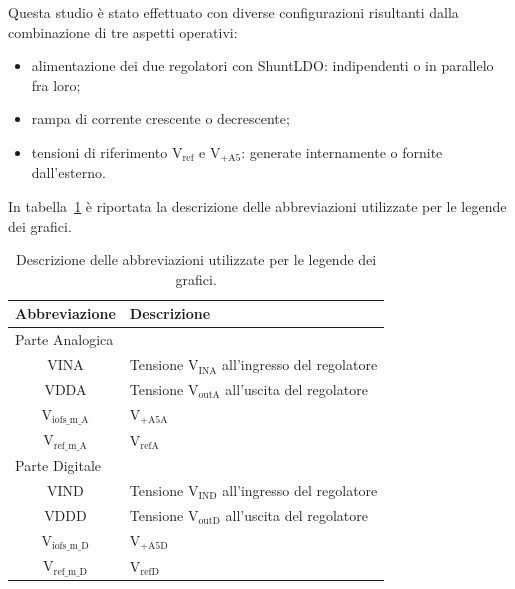 Questa studio è stato effettuato con diverse configurazioni risultanti dalla combinazione di tre aspetti operativi:
\begin{itemize}
  \item alimentazione dei due regolatori con ShuntLDO: indipendenti o in parallelo fra loro;
  \item rampa di corrente crescente o decrescente;
  \item tensioni di riferimento $\mathrm{V_{ref}}$ e $\mathrm{V_{+A5}}$: generate internamente o fornite dall'esterno.
\end{itemize}

In tabella~\ref{tab:legenda} è riportata la descrizione delle abbreviazioni utilizzate per le legende dei grafici.
\begin{table}
\begin{center}
\begin{tabular}{c|l}
 Abbreviazione & Descrizione\\ \hline
\multicolumn{2}{l}{Parte Analogica} \\
\hline
VINA & Tensione $\mathrm{V_{INA}}$ all'ingresso del regolatore  \\ \hline
VDDA & Tensione $\mathrm{V_{outA}}$ all'uscita del regolatore \\ \hline
$\mathrm{V_{iofs \_ m \_ A}}$ & $\mathrm{V_{+A5A}}$ \\ \hline   
$\mathrm{V_{ref \_ m \_ A}}$  & $\mathrm{V_{refA}}$ \\ \hline \hline  
\multicolumn{2}{l}{Parte Digitale} \\ \hline
VIND & Tensione $\mathrm{V_{IND}}$ all'ingresso del regolatore  \\ \hline
VDDD & Tensione $\mathrm{V_{outD}}$ all'uscita del regolatore \\ \hline
$\mathrm{V_{iofs \_ m \_ D}}$ & $\mathrm{V_{+A5D}}$ \\ \hline   
$\mathrm{V_{ref \_ m \_ D}}$  & $\mathrm{V_{refD}}$ \\ 
\end{tabular}
\end{center}
\caption{Descrizione delle abbreviazioni utilizzate per le legende dei grafici.}
\label{tab:legenda}
\end{table}

